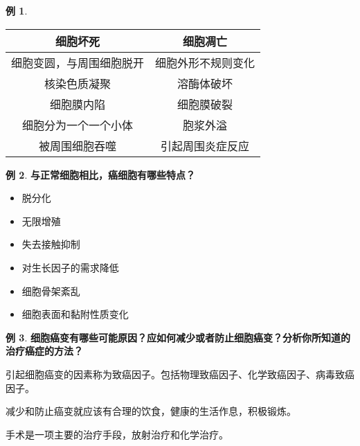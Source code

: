 \documentclass[UTF8]{article}
\theoremstyle{definition}
\newtheorem{example}{例}[section]
\begin{document}
\begin{example}
    \begin{tabular}{c|c}
        细胞坏死&细胞凋亡\\\hline  细胞变圆，与周围细胞脱开&细胞外形不规则变化\\ 核染色质凝聚&溶酶体破坏\\ 细胞膜内陷&细胞膜破裂\\ 细胞分为一个一个小体&胞浆外溢\\ 被周围细胞吞噬&引起周围炎症反应
    \end{tabular}
\end{example}\begin{example}\textbf{与正常细胞相比，癌细胞有哪些特点？}
    
    \begin{itemize}
        \item 脱分化\item 无限增殖\item 失去接触抑制\item 对生长因子的需求降低\item 细胞骨架紊乱\item 细胞表面和黏附性质变化
    \end{itemize}
\end{example}\begin{example}\textbf{细胞癌变有哪些可能原因？应如何减少或者防止细胞癌变？分析你所知道的治疗癌症的方法？}
    
    引起细胞癌变的因素称为致癌因子。包括物理致癌因子、化学致癌因子、病毒致癌因子。
    
    减少和防止癌变就应该有合理的饮食，健康的生活作息，积极锻炼。
    
    手术是一项主要的治疗手段，放射治疗和化学治疗。
\end{example}
\end{document}
